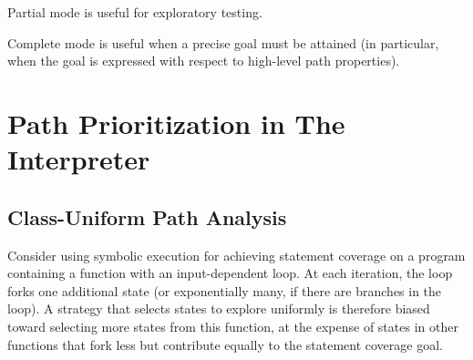 

Partial mode is useful for exploratory testing.

Complete mode is useful when a precise goal must be attained (in particular, when the goal is expressed with respect to high-level path properties).



\section{Path Prioritization in The Interpreter}
\label{sec:chef:strategies}





\subsection{Class-Uniform Path Analysis}

Consider using symbolic execution for achieving statement coverage on a program containing a function with an input-dependent loop.  At each iteration, the loop forks one additional state (or exponentially many, if there are branches in the loop). A strategy that selects states to explore uniformly is therefore biased toward selecting more states from this function, at the expense of states in other functions that fork less but contribute equally to the statement coverage goal.

